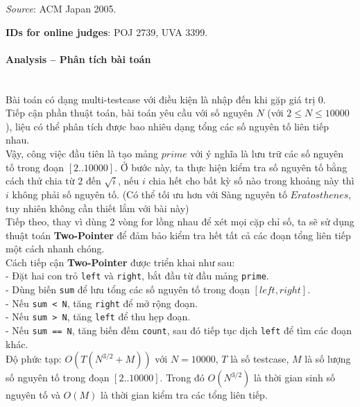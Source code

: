 \documentclass{article}
\begin{document}
\textit{Source}: ACM Japan 2005.

\textbf{IDs for online judges}: POJ 2739, UVA 3399.

\paragraph{Analysis -- Phân tích bài toán} \mbox{} \\

Bài toán có dạng multi-testcase với điều kiện là nhập đến khi gặp giá trị 0. \\

Tiếp cận phần thuật toán, bài toán yêu cầu với số nguyên $N$ (với $2 \leq N \leq 10000$), liệu có thể phân tích được bao nhiêu dạng tổng các số nguyên tố liên tiếp nhau. \\

Vậy, công việc đầu tiên là tạo mảng $prime$ với ý nghĩa là lưu trữ các số nguyên tố trong đoạn $[2..10000]$. Ở bước này, ta thực hiện kiểm tra số nguyên tố bằng cách thử chia từ $2$ đến $\sqrt{i}$, nếu $i$ chia hết cho bất kỳ số nào trong khoảng này thì $i$ không phải số nguyên tố. (Có thể tối ưu hơn với Sàng nguyên tố $Eratosthenes$, tuy nhiên không cần thiết lắm với bài này)\\

Tiếp theo, thay vì dùng 2 vòng for lồng nhau để xét mọi cặp chỉ số, ta sẽ sử dụng thuật toán \textbf{Two-Pointer} để đảm bảo kiểm tra hết tất cả các đoạn tổng liên tiếp một cách nhanh chóng. \\

Cách tiếp cận \textbf{Two-Pointer} được triển khai như sau: \\

- Đặt hai con trỏ \texttt{left} và \texttt{right}, bắt đầu từ đầu mảng \texttt{prime}. \\
- Dùng biến \texttt{sum} để lưu tổng các số nguyên tố trong đoạn $[left, right]$. \\
- Nếu \texttt{sum < N}, tăng \texttt{right} để mở rộng đoạn. \\
- Nếu \texttt{sum > N}, tăng \texttt{left} để thu hẹp đoạn. \\
- Nếu \texttt{sum == N}, tăng biến đếm \texttt{count}, sau đó tiếp tục dịch \texttt{left} để tìm các đoạn khác. \\

Độ phức tạp: $O(T(N^{3/2} + M))$ với $N = 10000$, $T$ là số testcase, $M$ là số lượng số nguyên tố trong đoạn $[2..10000]$. Trong đó $O(N^{3/2})$ là thời gian sinh số nguyên tố và $O(M)$ là thời gian kiểm tra các tổng liên tiếp. \\
\end{document}
